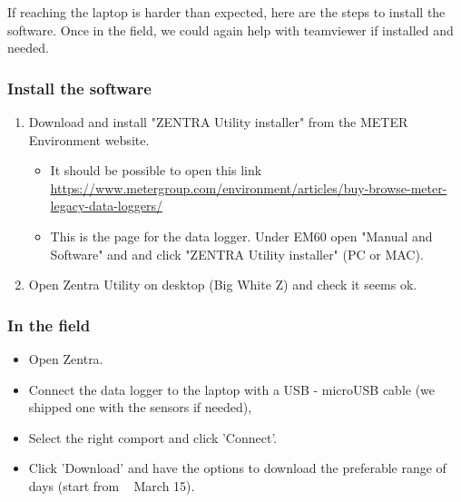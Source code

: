 \documentclass[a4paper,12pt]{article}
\begin{document}
If reaching the laptop is harder than expected, here are the steps to install the software.
Once in the field, we could again help with teamviewer if installed and needed.

\subsubsection{Install the software}
\begin{enumerate}
\item Download and install "ZENTRA Utility installer" from the METER Environment website.
\begin{itemize}
\item It should be possible to open this link \url{https://www.metergroup.com/environment/articles/buy-browse-meter-legacy-data-loggers/}
\item This is the page for the data logger. Under EM60 open "Manual and Software" and and click "ZENTRA Utility installer" (PC or MAC).
\end{itemize}
\item Open Zentra Utility on desktop (Big White Z) and check it seems ok.
\end{enumerate}

\subsubsection{In the field}
\begin{itemize}
\item Open Zentra.
\item Connect the data logger to the laptop with a USB - microUSB cable (we shipped one with the sensors if needed),
\item Select the right comport and click 'Connect'.
\item Click 'Download' and have the options to download the preferable range of days (start from ~ March 15).
\end{itemize}
\end{document}

